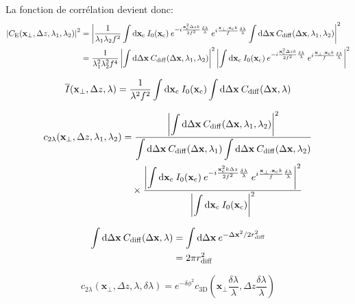 La fonction de corrélation devient donc:
\begin{align}
\left|C_{\mathrm{E}}(\mathbf{x}_{\perp},\Delta z, \lambda_1,\lambda_2)\right|^2 &= \left| \frac{1}{\lambda_1 \lambda_2 f^2} \int{\mathop{}\mathopen{}\mathrm{d}\mathbf{x}_{\mathrm{c}}\: I_0(\mathbf{x}_{\mathrm{c}}) \: e^{-i\frac{\mathbf{x}_{\mathrm{c}}^2 \Delta z k}{2f^2} \frac{\delta\lambda}{\lambda}} \: e^{i \frac{\mathbf{x}_{\perp}.\mathbf{x}_{\mathrm{c}}k }{f}\frac{\delta\lambda}{\lambda}}} \int{\mathop{}\mathopen{}\mathrm{d}\Delta\mathbf{x}\: C_{\mathrm{diff}}(\Delta\mathbf{x},\lambda_1,\lambda_2)} \right|^2 \\
&= \frac{1}{\lambda_1^2 \lambda_2^2 f^4} \left| \int{\mathop{}\mathopen{}\mathrm{d}\Delta\mathbf{x}\: C_{\mathrm{diff}}(\Delta\mathbf{x},\lambda_1,\lambda_2)} \right|^2 \left|\int{\mathop{}\mathopen{}\mathrm{d}\mathbf{x}_{\mathrm{c}}\: I_0(\mathbf{x}_{\mathrm{c}}) \: e^{-i\frac{\mathbf{x}_{\mathrm{c}}^2 \Delta z k}{2f^2} \frac{\delta\lambda}{\lambda}} \: e^{i\frac{\mathbf{x}_{\perp}.\mathbf{x}_{\mathrm{c}}k}{f}\frac{\delta\lambda}{\lambda}}} \right|^2
\end{align}

\begin{equation}
\overline{I}(\mathbf{x}_{\perp},\Delta z, \lambda)= \frac{1}{\lambda^2 f^2} \int{\mathop{}\mathopen{}\mathrm{d}\mathbf{x}_{\mathrm{c}}\: I_0(\mathbf{x}_{\mathrm{c}})} \int{\mathop{}\mathopen{}\mathrm{d}\Delta\mathbf{x}\: C_{\mathrm{diff}}(\Delta\mathbf{x},\lambda)}
\end{equation}

\begin{align}
c_{2\lambda}(\mathbf{x}_{\perp},\Delta z,\lambda_1,\lambda_2) &= \frac{\left| \displaystyle\int{\mathop{}\mathopen{}\mathrm{d}\Delta\mathbf{x}\: C_{\mathrm{diff}}(\Delta\mathbf{x},\lambda_1,\lambda_2)}\right|^2}{\displaystyle\int{\mathop{}\mathopen{}\mathrm{d}\Delta\mathbf{x}\: C_{\mathrm{diff}}(\Delta\mathbf{x},\lambda_1)}\displaystyle\int{\mathop{}\mathopen{}\mathrm{d}\Delta\mathbf{x}\: C_{\mathrm{diff}}(\Delta\mathbf{x},\lambda_2)}} \\
&\nonumber \quad\times \frac{\left|\displaystyle\int{\mathop{}\mathopen{}\mathrm{d}\mathbf{x}_{\mathrm{c}}\: I_0(\mathbf{x}_{\mathrm{c}}) \: e^{-i \frac{\mathbf{x}_{\mathrm{c}}^2 k \Delta z}{2f^2} \frac{\delta\lambda}{\lambda}} \: e^{i \frac{\mathbf{x}_{\perp}.\mathbf{x}_{\mathrm{c}}k}{f} \frac{\delta\lambda}{\lambda}}} \right|^2}{\left|\displaystyle\int{\mathop{}\mathopen{}\mathrm{d}\mathbf{x}_{\mathrm{c}}\: I_0(\mathbf{x}_{\mathrm{c}})} \right|^2}
\end{align}

\begin{align}
\int{\mathop{}\mathopen{}\mathrm{d}\Delta\mathbf{x}\: C_{\mathrm{diff}}(\Delta\mathbf{x},\lambda)} &= \int{\mathop{}\mathopen{}\mathrm{d}\Delta\mathbf{x}\: e^{-\Delta\mathbf{x}^2/2r_{\mathrm{diff}}^2}} \\
&= 2\pi r_{\mathrm{diff}}^2
\end{align}

\begin{equation}
c_{2\lambda}(\mathbf{x}_{\perp},\Delta z,\lambda,\delta\lambda)=e^{-\delta\phi^2} c_{\mathrm{3D}}\left(\mathbf{x}_{\perp} \frac{\delta\lambda}{\lambda}, \Delta z \frac{\delta\lambda}{\lambda}\right)
\end{equation}
